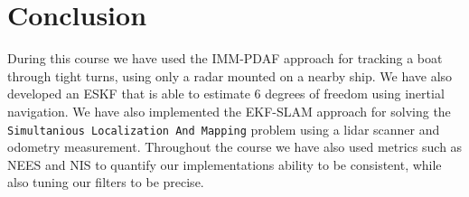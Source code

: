 \section{Conclusion}
During this course we have used the IMM-PDAF approach for tracking a boat through tight turns, using only a radar mounted on a nearby ship. We have also developed an ESKF that is able to estimate 6 degrees of freedom using inertial navigation. We have also implemented the EKF-SLAM approach for solving the \texttt{Simultanious Localization And Mapping} problem using a lidar scanner and odometry measurement. Throughout the course we have also used metrics such as NEES and NIS to quantify our implementations ability to be consistent, while also tuning our filters to be precise.
